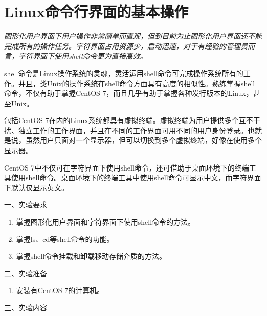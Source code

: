 \chapter{Linux命令行界面的基本操作}

{\itshape
图形化用户界面下用户操作非常简单而直观，但到目前为止图形化用户界面还不能完成所有的操作任务。字符界面占用资源少，启动迅速，对于有经验的管理员而言，字符界面下使用shell命令更为直接高效。

shell命令是Linux操作系统的灵魂，灵活运用shell命令可完成操作系统所有的工作。并且，类Unix的操作系统在shell命令方面具有高度的相似性。熟练掌握shell命令，不仅有助于掌握CentOS 7，而且几乎有助于掌握各种发行版本的Linux，甚至Unix。

包括CentOS 7在内的Linux系统都具有虚拟终端。虚拟终端为用户提供多个互不干扰、独立工作的工作界面，并且在不同的工作界面可用不同的用户身份登录。也就是说，虽然用户只面对一个显示器，但可以切换到多个虚拟终端，好像在使用多个显示器。

CentOS 7中不仅可在字符界面下使用shell命令，还可借助于桌面环境下的终端工具使用shell命令。桌面环境下的终端工具中使用shell命令可显示中文，而字符界面下默认仅显示英文。
}

\vspace{0.2in}
\noindent
一、实验要求
\begin{enumerate}
  \item 掌握图形化用户界面和字符界面下使用shell命令的方法。
  \item 掌握ls、cd等shell命令的功能。
  \item 掌握shell命令挂载和卸载移动存储介质的方法。
\end{enumerate}

\vspace{0.2in}
\noindent
二、实验准备
\begin{enumerate}
  \item 安装有CentOS 7的计算机。
\end{enumerate}

\vspace{0.2in}
\noindent
三、实验内容


